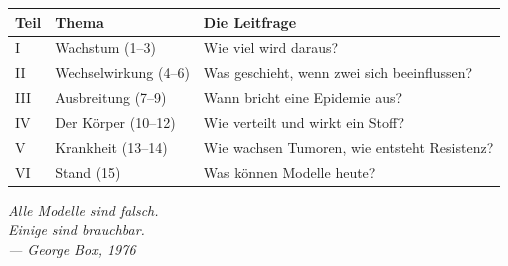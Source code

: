 \begin{merksatz}
\begin{center}
{\small
\renewcommand{\arraystretch}{1.45}
\begin{tabular}{@{}P{1.0cm}P{3.0cm}P{4.6cm}@{}}
\toprule
\textbf{Teil} & \textbf{Thema} & \textbf{Die Leitfrage}\\
\midrule
I & Wachstum (1--3) & Wie viel wird daraus?\\
II & Wechselwirkung (4--6) & Was geschieht, wenn zwei sich beeinflussen?\\
III & Ausbreitung (7--9) & Wann bricht eine Epidemie aus?\\
IV & Der Körper (10--12) & Wie verteilt und wirkt ein Stoff?\\
V & Krankheit (13--14) & Wie wachsen Tumoren, wie entsteht Resistenz?\\
VI & Stand (15) & Was können Modelle heute?\\
\bottomrule
\end{tabular}}
\end{center}
\end{merksatz}

\vspace{10pt}
\begin{flushright}
\itshape\color{grau}
Alle Modelle sind falsch.\\
Einige sind brauchbar.\\[8pt]
\normalfont\color{grau}\upshape --- George Box, 1976
\end{flushright}
